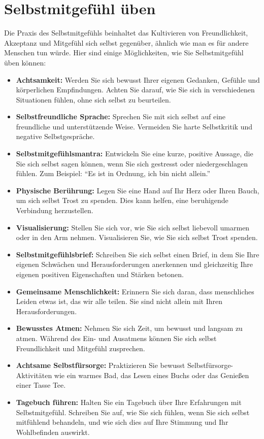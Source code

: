 \section{Selbstmitgefühl üben}
Die Praxis des Selbstmitgefühls beinhaltet das Kultivieren von Freundlichkeit, Akzeptanz und Mitgefühl sich selbst gegenüber, ähnlich wie man es für andere Menschen tun würde. Hier sind einige Möglichkeiten, wie Sie Selbstmitgefühl üben können:
\begin{itemize}
    \item \textbf{Achtsamkeit:} Werden Sie sich bewusst Ihrer eigenen Gedanken, Gefühle und körperlichen Empfindungen. Achten Sie darauf, wie Sie sich in verschiedenen Situationen fühlen, ohne sich selbst zu beurteilen.
    \item \textbf{Selbstfreundliche Sprache:} Sprechen Sie mit sich selbst auf eine freundliche und unterstützende Weise. Vermeiden Sie harte Selbstkritik und negative Selbstgespräche.
    \item \textbf{Selbstmitgefühlsmantra:} Entwickeln Sie eine kurze, positive Aussage, die Sie sich selbst sagen können, wenn Sie sich gestresst oder niedergeschlagen fühlen. Zum Beispiel: \enquote{Es ist in Ordnung, ich bin nicht allein.}
    \item \textbf{Physische Berührung:} Legen Sie eine Hand auf Ihr Herz oder Ihren Bauch, um sich selbst Trost zu spenden. Dies kann helfen, eine beruhigende Verbindung herzustellen.
    \item \textbf{Visualisierung:} Stellen Sie sich vor, wie Sie sich selbst liebevoll umarmen oder in den Arm nehmen. Visualisieren Sie, wie Sie sich selbst Trost spenden.
    \item \textbf{Selbstmitgefühlsbrief:} Schreiben Sie sich selbst einen Brief, in dem Sie Ihre eigenen Schwächen und Herausforderungen anerkennen und gleichzeitig Ihre eigenen positiven Eigenschaften und Stärken betonen.
    \item \textbf{Gemeinsame Menschlichkeit:} Erinnern Sie sich daran, dass menschliches Leiden etwas ist, das wir alle teilen. Sie sind nicht allein mit Ihren Herausforderungen.
    \item \textbf{Bewusstes Atmen:} Nehmen Sie sich Zeit, um bewusst und langsam zu atmen. Während des Ein- und Ausatmens können Sie sich selbst Freundlichkeit und Mitgefühl zusprechen.
    \item \textbf{Achtsame Selbstfürsorge:} Praktizieren Sie bewusst Selbstfürsorge-Aktivitäten wie ein warmes Bad, das Lesen eines Buchs oder das Genießen einer Tasse Tee.
    \item \textbf{Tagebuch führen:} Halten Sie ein Tagebuch über Ihre Erfahrungen mit Selbstmitgefühl. Schreiben Sie auf, wie Sie sich fühlen, wenn Sie sich selbst mitfühlend behandeln, und wie sich dies auf Ihre Stimmung und Ihr Wohlbefinden auswirkt.
\end{itemize}
